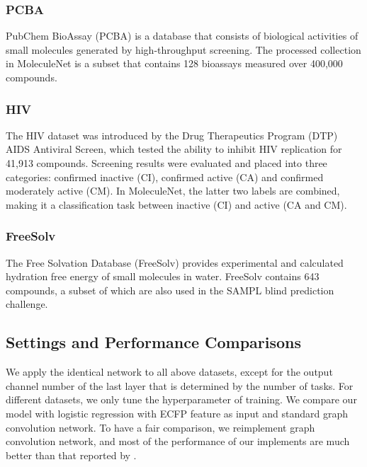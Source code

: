 \documentclass[letterpaper]{article} \usepackage{aaai18}  \usepackage{times}  \usepackage{helvet}  \usepackage{courier}  \usepackage{url}  \usepackage{graphicx}  \usepackage{amsmath}
\begin{document}
\subsubsection{PCBA}
PubChem BioAssay (PCBA) is a database that consists of biological activities of small molecules generated by high-throughput screening\cite{wang2011pubchem}. The processed collection in MoleculeNet is a subset that contains 128 bioassays measured over 400,000 compounds.

\subsubsection{HIV}The HIV dataset was introduced by the Drug Therapeutics Program (DTP) AIDS Antiviral Screen, which tested the ability to inhibit HIV replication for 41,913 compounds\cite{hiv}. Screening results were evaluated and placed into three categories: confirmed inactive (CI), confirmed active (CA) and confirmed moderately active (CM). In MoleculeNet, the latter two labels are combined, making it a classification task between inactive (CI) and active (CA and CM).

\subsubsection{FreeSolv}The Free Solvation Database (FreeSolv) provides experimental and calculated hydration free energy of small molecules in water\cite{Mobley2014FreeSolv}. FreeSolv contains 643 compounds, a subset of which are also used in the SAMPL blind prediction challenge\cite{Mobley2014Blind}. 



\subsection{Settings and Performance Comparisons}
We apply the identical network to all above datasets, except for the output channel number of the last layer that is determined by the number of tasks. For different datasets, we only tune the hyperparameter of training. We compare our model with logistic regression with ECFP feature as input and standard graph convolution network. To have a fair comparison, we reimplement graph convolution network, and most of the performance of our implements are much better than that reported by \cite{wu2017moleculenet}.
\end{document}

